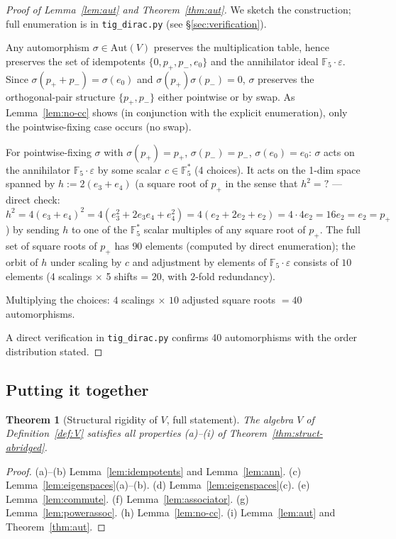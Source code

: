 \documentclass[11pt,reqno]{amsart}
\theoremstyle{plain}
\newtheorem{theorem}{Theorem}[section]
\theoremstyle{definition}
\theoremstyle{remark}
\newcommand{\F}{\mathbb{F}}
\newcommand{\Aut}{\mathrm{Aut}}
\begin{document}
\begin{proof}[Proof of Lemma~\ref{lem:aut} and Theorem~\ref{thm:aut}]
We sketch the construction; full enumeration is in \texttt{tig\_dirac.py} (see §\ref{sec:verification}).

Any automorphism $\sigma \in \Aut(V)$ preserves the multiplication table, hence preserves the set of idempotents $\{0, p_+, p_-, e_0\}$ and the annihilator ideal $\F_5 \cdot \varepsilon$. Since $\sigma(p_+ + p_-) = \sigma(e_0)$ and $\sigma(p_+) \sigma(p_-) = 0$, $\sigma$ preserves the orthogonal-pair structure $\{p_+, p_-\}$ either pointwise or by swap. As Lemma~\ref{lem:no-cc} shows (in conjunction with the explicit enumeration), only the pointwise-fixing case occurs (no swap).

For pointwise-fixing $\sigma$ with $\sigma(p_+) = p_+$, $\sigma(p_-) = p_-$, $\sigma(e_0) = e_0$: $\sigma$ acts on the annihilator $\F_5 \cdot \varepsilon$ by some scalar $c \in \F_5^*$ (4 choices). It acts on the 1-dim space spanned by $h := 2(e_3 + e_4)$ (a square root of $p_+$ in the sense that $h^2 = ?$ — direct check: $h^2 = 4(e_3 + e_4)^2 = 4(e_3^2 + 2 e_3 e_4 + e_4^2) = 4(e_2 + 2 e_2 + e_2) = 4 \cdot 4 e_2 = 16 e_2 = e_2 = p_+$) by sending $h$ to one of the $\F_5^*$ scalar multiples of any square root of $p_+$. The full set of square roots of $p_+$ has $90$ elements (computed by direct enumeration); the orbit of $h$ under scaling by $c$ and adjustment by elements of $\F_5 \cdot \varepsilon$ consists of $10$ elements (4 scalings $\times$ 5 shifts = $20$, with $2$-fold redundancy).

Multiplying the choices: $4$ scalings $\times$ $10$ adjusted square roots $= 40$ automorphisms.

A direct verification in \texttt{tig\_dirac.py} confirms 40 automorphisms with the order distribution stated.
\end{proof}

\subsection{Putting it together}

\begin{theorem}[Structural rigidity of $V$, full statement] \label{thm:struct}
The algebra $V$ of Definition~\ref{def:V} satisfies all properties (a)--(i) of Theorem~\ref{thm:struct-abridged}.
\end{theorem}

\begin{proof}
(a)--(b) Lemma~\ref{lem:idempotents} and Lemma~\ref{lem:ann}.
(c) Lemma~\ref{lem:eigenspaces}(a)--(b).
(d) Lemma~\ref{lem:eigenspaces}(c).
(e) Lemma~\ref{lem:commute}.
(f) Lemma~\ref{lem:associator}.
(g) Lemma~\ref{lem:powerassoc}.
(h) Lemma~\ref{lem:no-cc}.
(i) Lemma~\ref{lem:aut} and Theorem~\ref{thm:aut}.
\end{proof}
\end{document}
